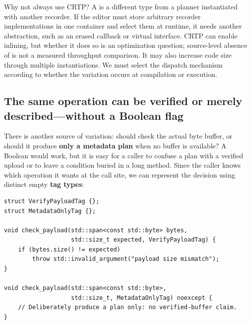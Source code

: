 Why not always use CRTP? A  is a different type from a planner instantiated with another recorder. If the editor must store arbitrary recorder implementations in one container and select them at runtime, it needs another abstraction, such as an erased callback or virtual interface. CRTP can enable inlining, but whether it does so is an optimization question; source-level absence of  is not a measured throughput comparison. It may also increase code size through multiple instantiations. We must select the dispatch mechanism according to whether the variation occurs at compilation or execution.

\subsection{The same operation can be verified or merely described---without a Boolean flag}\label{05-engine-i-ch005-the-same-operation-can-be-verified-or-merely-describedwithout-a-boolean-flag}

\hypertarget{05-engine-i-ch005-the-same-operation-can-be-verified-or-merely-describedwithout-a-boolean-flag}{}

There is another source of variation: should  check the actual byte buffer, or should it produce \textbf{only a metadata plan} when no buffer is available? A Boolean  would work, but it is easy for a caller to confuse a plan with a verified upload or to leave a condition buried in a long method. Since the caller knows which operation it wants at the call site, we can represent the decision using distinct empty \textbf{tag types}:

\begin{verbatim}
struct VerifyPayloadTag {};
struct MetadataOnlyTag {};

void check_payload(std::span<const std::byte> bytes,
                   std::size_t expected, VerifyPayloadTag) {
    if (bytes.size() != expected)
        throw std::invalid_argument("payload size mismatch");
}

void check_payload(std::span<const std::byte>,
                   std::size_t, MetadataOnlyTag) noexcept {
    // Deliberately produce a plan only: no verified-buffer claim.
}
\end{verbatim}

